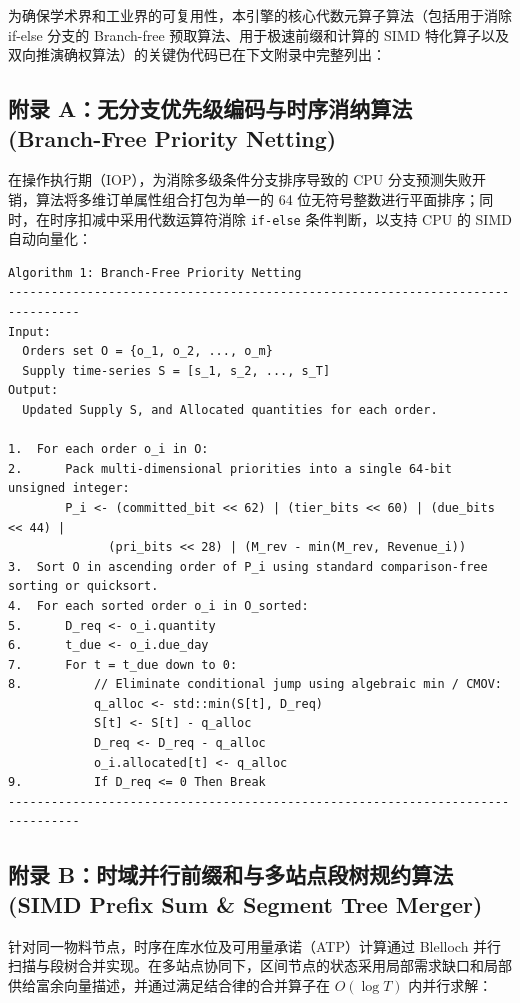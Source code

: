 \documentclass[11pt,a4paper]{article}
\begin{document}
为确保学术界和工业界的可复用性，本引擎的核心代数元算子算法（包括用于消除 if-else 分支的 Branch-free 预取算法、用于极速前缀和计算的 SIMD 特化算子以及双向推演确权算法）的关键伪代码已在下文附录中完整列出：

\subsection*{附录 A：无分支优先级编码与时序消纳算法 (Branch-Free Priority Netting)}

在操作执行期（IOP），为消除多级条件分支排序导致的 CPU 分支预测失败开销，算法将多维订单属性组合打包为单一的 64 位无符号整数进行平面排序；同时，在时序扣减中采用代数运算符消除 \texttt{if-else} 条件判断，以支持 CPU 的 SIMD 自动向量化：

\begin{verbatim}
Algorithm 1: Branch-Free Priority Netting
--------------------------------------------------------------------------------
Input: 
  Orders set O = {o_1, o_2, ..., o_m}
  Supply time-series S = [s_1, s_2, ..., s_T]
Output: 
  Updated Supply S, and Allocated quantities for each order.

1.  For each order o_i in O:
2.      Pack multi-dimensional priorities into a single 64-bit unsigned integer:
        P_i <- (committed_bit << 62) | (tier_bits << 60) | (due_bits << 44) | 
              (pri_bits << 28) | (M_rev - min(M_rev, Revenue_i))
3.  Sort O in ascending order of P_i using standard comparison-free sorting or quicksort.
4.  For each sorted order o_i in O_sorted:
5.      D_req <- o_i.quantity
6.      t_due <- o_i.due_day
7.      For t = t_due down to 0:
8.          // Eliminate conditional jump using algebraic min / CMOV:
            q_alloc <- std::min(S[t], D_req)
            S[t] <- S[t] - q_alloc
            D_req <- D_req - q_alloc
            o_i.allocated[t] <- q_alloc
9.          If D_req <= 0 Then Break
--------------------------------------------------------------------------------
\end{verbatim}

\subsection*{附录 B：时域并行前缀和与多站点段树规约算法 (SIMD Prefix Sum \& Segment Tree Merger)}

针对同一物料节点，时序在库水位及可用量承诺（ATP）计算通过 Blelloch 并行扫描与段树合并实现。在多站点协同下，区间节点的状态采用局部需求缺口和局部供给富余向量描述，并通过满足结合律的合并算子在 $O(\log T)$ 内并行求解：
\end{document}

